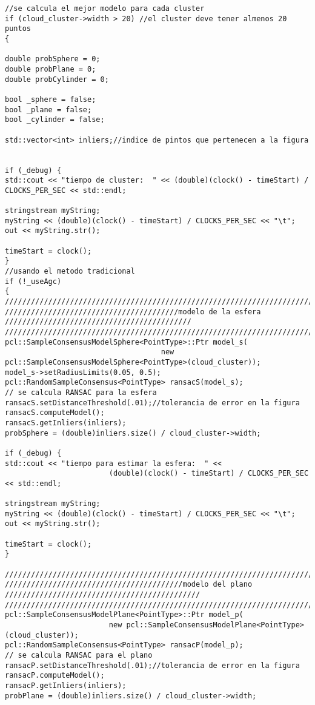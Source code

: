 {\begin{lstlisting}[caption={Archivo test.cpp}]
//se calcula el mejor modelo para cada cluster
if (cloud_cluster->width > 20) //el cluster deve tener almenos 20 puntos
{

double probSphere = 0;
double probPlane = 0;
double probCylinder = 0;

bool _sphere = false;
bool _plane = false;
bool _cylinder = false;

std::vector<int> inliers;//indice de pintos que pertenecen a la figura


if (_debug) {
std::cout << "tiempo de cluster:  " << (double)(clock() - timeStart) / CLOCKS_PER_SEC << std::endl;

stringstream myString;
myString << (double)(clock() - timeStart) / CLOCKS_PER_SEC << "\t";
out << myString.str();

timeStart = clock();
}
//usando el metodo tradicional
if (!_useAgc)
{
///////////////////////////////////////////////////////////////////////////////////////////////////////
////////////////////////////////////////modelo de la esfera ///////////////////////////////////////////
///////////////////////////////////////////////////////////////////////////////////////////////////////
pcl::SampleConsensusModelSphere<PointType>::Ptr model_s(
									new pcl::SampleConsensusModelSphere<PointType>(cloud_cluster));
model_s->setRadiusLimits(0.05, 0.5);
pcl::RandomSampleConsensus<PointType> ransacS(model_s);
// se calcula RANSAC para la esfera
ransacS.setDistanceThreshold(.01);//tolerancia de error en la figura
ransacS.computeModel();
ransacS.getInliers(inliers);
probSphere = (double)inliers.size() / cloud_cluster->width;

if (_debug) {
std::cout << "tiempo para estimar la esfera:  " << 
						(double)(clock() - timeStart) / CLOCKS_PER_SEC << std::endl;

stringstream myString;
myString << (double)(clock() - timeStart) / CLOCKS_PER_SEC << "\t";
out << myString.str();

timeStart = clock();
}

///////////////////////////////////////////////////////////////////////////////////////////////////////
/////////////////////////////////////////modelo del plano /////////////////////////////////////////////
///////////////////////////////////////////////////////////////////////////////////////////////////////
pcl::SampleConsensusModelPlane<PointType>::Ptr model_p(
						new pcl::SampleConsensusModelPlane<PointType>(cloud_cluster));
pcl::RandomSampleConsensus<PointType> ransacP(model_p);
// se calcula RANSAC para el plano 
ransacP.setDistanceThreshold(.01);//tolerancia de error en la figura
ransacP.computeModel();
ransacP.getInliers(inliers);
probPlane = (double)inliers.size() / cloud_cluster->width;


\end{lstlisting}}
